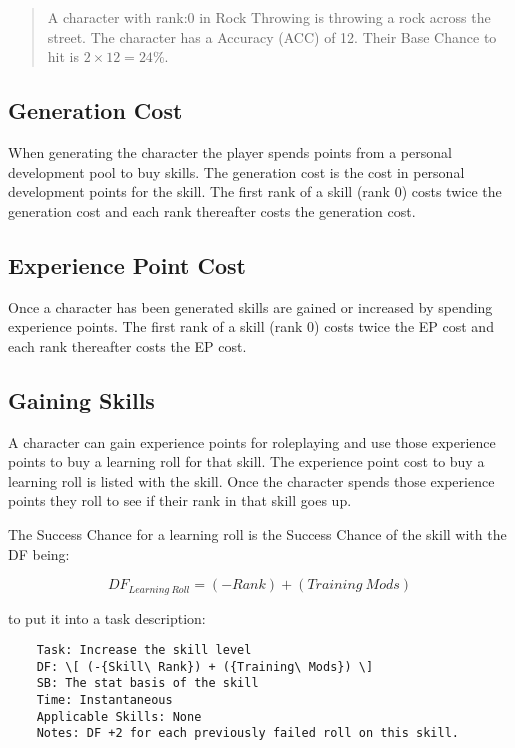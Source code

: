 \begin{quote}
A character with rank:0 in Rock Throwing is throwing a rock 
across the street. The character has a Accuracy (ACC) of 12. Their Base Chance 
to hit is \( 2 \times 12 = 24\% \).
\end{quote}

\subsection{Generation Cost}

When generating the character the player spends points from a
personal development pool to buy skills. The generation cost is the 
cost in personal development points for the skill. The first rank of 
a skill (rank 0) costs twice the generation cost and each rank 
thereafter costs the generation cost. 

\subsection{Experience Point Cost}

Once a character has been generated skills are gained or increased by 
spending experience points. The first rank of a skill (rank 0) costs 
twice the EP cost and each rank thereafter costs the EP cost. 

\subsection{Gaining Skills}

A character can gain experience points for roleplaying and use those 
experience points to buy a learning roll for that skill. The 
experience point cost to buy a learning roll is listed with the 
skill. Once the character spends those experience points they roll to 
see if their rank in that skill goes up.

The Success Chance for a learning roll is the Success Chance of the skill with 
the DF being: 

\[DF_{Learning\ Roll} = (-Rank) + ({Training\ Mods}) \]

to put it into a task description:

\begin{verbatim}
	Task: Increase the skill level
	DF: \[ (-{Skill\ Rank}) + ({Training\ Mods}) \]
	SB: The stat basis of the skill
	Time: Instantaneous
    Applicable Skills: None
	Notes: DF +2 for each previously failed roll on this skill.
\end{verbatim}

